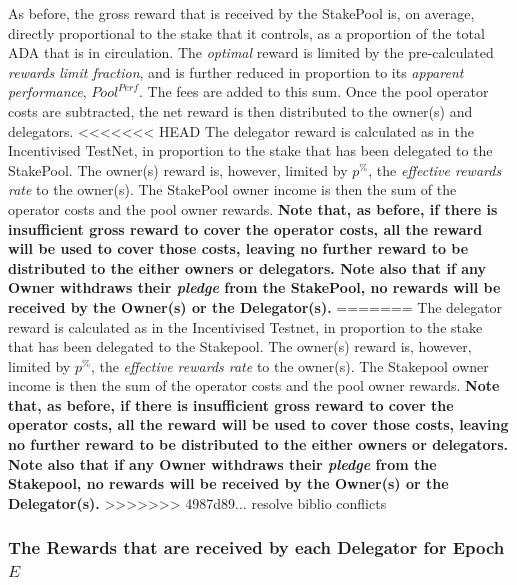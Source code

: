 \documentclass[11pt,a4paper,dvipsnames,twosided,final]{article}
\newcommand{\ada}{ADA{}}
\begin{document}
\noindent
As before, the gross reward that is received by the StakePool is, on average, directly proportional to the
stake that it controls, as a proportion of the total \ada{} that is in circulation.
The \emph{optimal} reward is limited by the pre-calculated \emph{rewards limit fraction}, and is further reduced in
proportion to its \emph{apparent performance}, $\textit{Pool}^{\textit{Perf}}$.
The fees are added to this sum.
Once the pool operator costs are subtracted,
the net reward is then distributed to the owner(s) and delegators.
<<<<<<< HEAD
The delegator reward is calculated as in the Incentivised TestNet, in proportion to the stake that has
been delegated to the StakePool.
The owner(s) reward is, however, limited by $p^\%$, the \emph{effective rewards rate} to the owner(s).
%
The StakePool owner income is then the sum of the operator costs and the pool owner rewards.
\textbf{Note that, as before, if there is insufficient gross reward to cover the operator costs, all the reward will be used to cover those
costs, leaving no further reward to be distributed to the either owners or delegators.
Note also that if any Owner withdraws their \emph{pledge} from the StakePool, no rewards will be received by the Owner(s) or the Delegator(s).}
=======
The delegator reward is calculated as in the Incentivised Testnet, in proportion to the stake that has
been delegated to the Stakepool.
The owner(s) reward is, however, limited by $p^\%$, the \emph{effective rewards rate} to the owner(s).
%
The Stakepool owner income is then the sum of the operator costs and the pool owner rewards.
\textbf{Note that, as before, if there is insufficient gross reward to cover the operator costs, all the reward will be used to cover those
costs, leaving no further reward to be distributed to the either owners or delegators.
Note also that if any Owner withdraws their \emph{pledge} from the Stakepool, no rewards will be received by the Owner(s) or the Delegator(s).}
>>>>>>> 4987d89... resolve biblio conflicts

\subsubsection*{The Rewards that are received by each Delegator for Epoch $E$}
\end{document}
